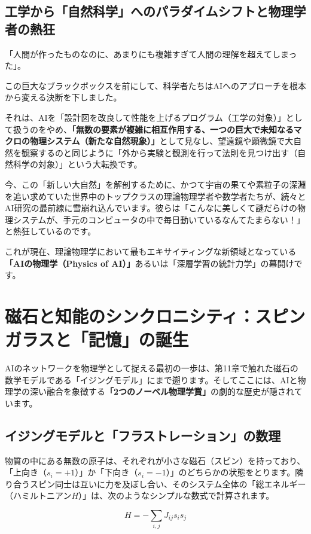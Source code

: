 \subsection{工学から「自然科学」へのパラダイムシフトと物理学者の熱狂}

「人間が作ったものなのに、あまりにも複雑すぎて人間の理解を超えてしまった」。

この巨大なブラックボックスを前にして、科学者たちはAIへのアプローチを根本から変える決断を下しました。

それは、AIを「設計図を改良して性能を上げるプログラム（工学の対象）」として扱うのをやめ、\textbf{「無数の要素が複雑に相互作用する、一つの巨大で未知なるマクロの物理システム（新たな自然現象）」}として見なし、望遠鏡や顕微鏡で大自然を観察するのと同じように「外から実験と観測を行って法則を見つけ出す（自然科学の対象）」という大転換です。

今、この「新しい大自然」を解剖するために、かつて宇宙の果てや素粒子の深淵を追い求めていた世界中のトップクラスの理論物理学者や数学者たちが、続々とAI研究の最前線に雪崩れ込んでいます。彼らは「こんなに美しくて謎だらけの物理システムが、手元のコンピュータの中で毎日動いているなんてたまらない！」と熱狂しているのです。

これが現在、理論物理学において最もエキサイティングな新領域となっている\textbf{「AIの物理学（Physics of AI）」}あるいは「深層学習の統計力学」の幕開けです。

\section{磁石と知能のシンクロニシティ：スピンガラスと「記憶」の誕生}

AIのネットワークを物理学として捉える最初の一歩は、第11章で触れた磁石の数学モデルである「イジングモデル」にまで遡ります。そしてここには、AIと物理学の深い融合を象徴する\textbf{「2つのノーベル物理学賞」}の劇的な歴史が隠されています。

\subsection{イジングモデルと「フラストレーション」の数理}

物質の中にある無数の原子は、それぞれが小さな磁石（スピン）を持っており、「上向き（\(s_i = +1\)）」か「下向き（\(s_i = -1\)）」のどちらかの状態をとります。隣り合うスピン同士は互いに力を及ぼし合い、そのシステム全体の「総エネルギー（ハミルトニアン\(H\)）」は、次のようなシンプルな数式で計算されます。

\[H = -\sum_{i,j} J_{ij} s_i s_j\]

